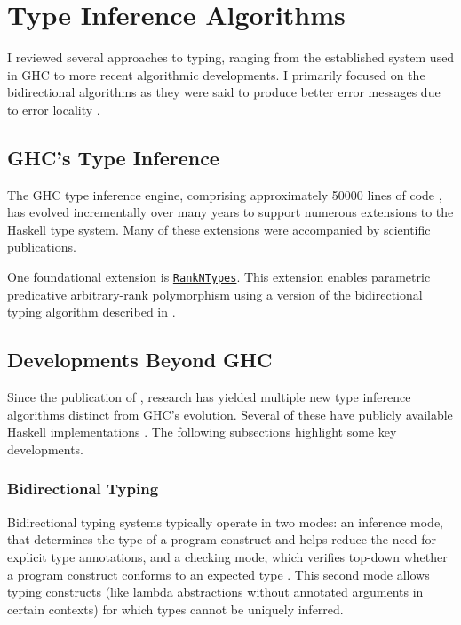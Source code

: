 \section{Type Inference Algorithms}
\label{sec:TypeInferenceAlgorithm}

I reviewed several approaches to typing, ranging from the established system used in GHC to more recent algorithmic developments. I primarily focused on the bidirectional algorithms as they were said to produce better error messages due to error locality \cite{dunfield-bidirectional-2020}.

\subsection{GHC's Type Inference}

The GHC type inference engine, comprising approximately 50000 lines of code \cite{jones-typechecker-2023}, has evolved incrementally over many years to support numerous extensions to the Haskell type system. Many of these extensions were accompanied by scientific publications.

One foundational extension is \href{https://gitlab.haskell.org/haskell/prime/-/wikis/RankNTypes}{\texttt{RankNTypes}}. This extension enables parametric predicative arbitrary-rank polymorphism using a version of the bidirectional typing algorithm described in \cite{jones-practical-2007}.

\subsection{Developments Beyond GHC}

Since the publication of \cite{jones-practical-2007}, research has yielded multiple new type inference algorithms distinct from GHC's evolution. Several of these have publicly available Haskell implementations \cite{github-goldenberg-artem-goldenbergbidirectionalsystem-2025, github-choi-kwanghoonbidi-2025, github-chen-cu1ch3ntype-inference-zoo-2025}. The following subsections highlight some key developments.

\subsubsection{Bidirectional Typing}

Bidirectional typing systems typically operate in two modes: an inference mode, that determines the type of a program construct and helps reduce the need for explicit type annotations, and a checking mode, which verifies top-down whether a program construct conforms to an expected type \cite{dunfield-bidirectional-2020}. This second mode allows typing constructs (like lambda abstractions without annotated arguments in certain contexts) for which types cannot be uniquely inferred.

